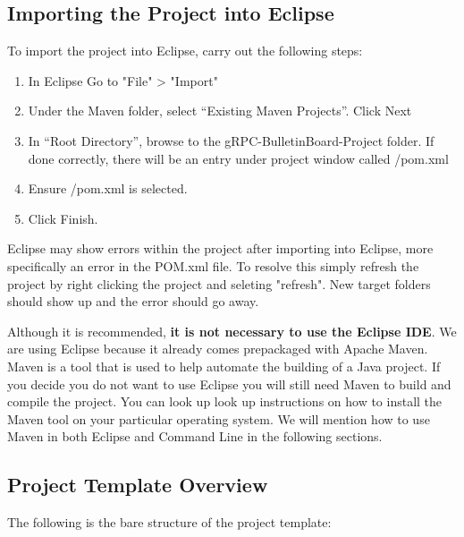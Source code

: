 \documentclass{article}
\newenvironment{info}[1][Info:]{ %
	\medskip
	\begin{mdframed}[style=info]
		\noindent{\textbf{#1}}
}{
	\end{mdframed}
}
\begin{document}
\subsection{Importing the Project into Eclipse}
To import the project into Eclipse, carry out the following steps:
\begin{enumerate}
\item In Eclipse Go to "File" > "Import"
\item Under the Maven folder, select “Existing Maven Projects”. Click Next
\item In “Root Directory”, browse to the gRPC-BulletinBoard-Project folder. If done correctly, there will be an entry under project window called /pom.xml
\item Ensure /pom.xml is selected. 
\item Click Finish.
\end{enumerate}
\begin{info}[Note:]
Eclipse may show errors within the project after importing into Eclipse, more specifically an error in the POM.xml file. To resolve this simply refresh the project by right clicking the project and seleting "refresh". New target folders should show up and the error should go away. 
\end{info}
\begin{info}[Eclipse is not mandatory:]
Although it is recommended, \textbf{it is not necessary to use the Eclipse IDE}. We are using Eclipse because it already comes prepackaged with Apache Maven. Maven is a tool that is used to help automate the building of a Java project. If you decide you do not want to use Eclipse you will still need Maven to build and compile the project. You can look up look up instructions on how to install the Maven tool on your particular operating system. We will mention how to use Maven in both Eclipse and Command Line in the following sections.
\end{info}

\subsection{Project Template Overview}

The following is the bare structure of the project template: \\

\end{document}
